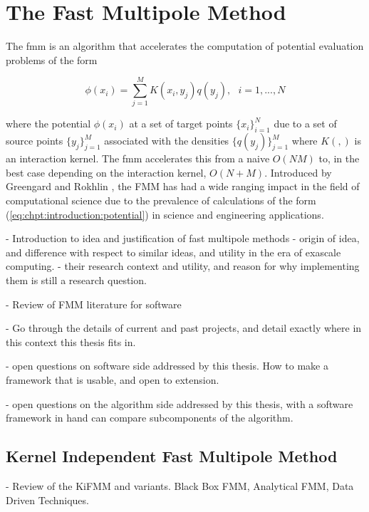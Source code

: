 
\chapter{The Fast Multipole Method}\label{chpt:fmm}
\thispagestyle{chaptertitle} %



The \acrfull{fmm} is an algorithm that accelerates the computation of potential evaluation problems of the form

\begin{equation}
    \label{eq:chpt:introduction:potential}
    \phi(x_i) = \sum_{j=1}^M K(x_i, y_j) q(y_j), \> \> \> i=1,...,N
\end{equation}

where the potential $\phi(x_i)$ at a set of target points $\{ x_i \}_{i=1}^N$ due to a set of source points $\{ y_j \}_{j=1}^M$  associated with the densities $\{ q(y_j) \}_{j=1}^M$ where $K(,)$ is an interaction kernel. The \acrshort{fmm} accelerates this from a naive $O(NM)$ to, in the best case depending on the interaction kernel, $O(N + M)$. Introduced by Greengard and Rokhlin \cite{greengard1987fast}, the FMM has had a wide ranging impact in the field of computational science due to the prevalence of calculations of the form (\ref{eq:chpt:introduction:potential}) in science and engineering applications.

- Introduction to idea and justification of fast multipole methods
- origin of idea, and difference with respect to similar ideas, and utility in the era of exascale computing.
- their research context and utility, and reason for why implementing them is still a research question.

- Review of FMM literature for software

- Go through the details of current and past projects, and detail exactly where in this context this thesis fits in.

- open questions on software side addressed by this thesis. How to make a framework that is usable, and open to extension.

- open questions on the algorithm side addressed by this thesis, with a software framework in hand can compare subcomponents of the algorithm.

\section{Kernel Independent Fast Multipole Method}

- Review of the KiFMM and variants. Black Box FMM, Analytical FMM, Data Driven Techniques.

